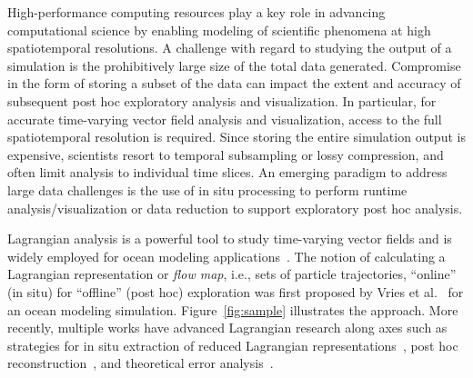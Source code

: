 %
High-performance computing resources play a key role in advancing computational science by enabling modeling of scientific phenomena at high spatiotemporal resolutions.
%
%
A challenge with regard to studying the output of a simulation is the prohibitively large size of the total data generated.
%
Compromise in the form of storing a subset of the data can impact the extent and accuracy of subsequent post hoc exploratory analysis and visualization.
%
In particular, for accurate time-varying vector field analysis and visualization, access to the full spatiotemporal resolution is required.
%
Since storing the entire simulation output is expensive, scientists resort to temporal subsampling or lossy compression, and often limit analysis to individual time slices.
%
An emerging paradigm to address large data challenges is the use of in situ processing to perform runtime analysis/visualization or data reduction to support exploratory post hoc analysis.
%
%

%
Lagrangian analysis is a powerful tool to study time-varying vector fields and is widely employed for ocean modeling applications~\cite{VANSEBILLE201849}.
%
The notion of calculating a Lagrangian representation or \textit{flow map}, i.e., sets of particle trajectories, ``online'' (in situ) for ``offline'' (post hoc) exploration was first proposed by Vries et al.~\cite{vries2001calculating} for an ocean modeling simulation.
%
Figure~\ref{fig:sample} illustrates the approach.
%
More recently, multiple works have advanced Lagrangian research along axes such as strategies for in situ extraction of reduced Lagrangian representations~\cite{agranovsky2014improved}\cite{rapp2019void}\cite{sane2020scalable}, post hoc reconstruction~\cite{chandler2015interpolation}\cite{sane2019interpolation}\cite{Jakob20}, and theoretical error analysis~\cite{bujack2015lagrangian}\cite{chandler2016analysis}\cite{hummel2016error}.
%

